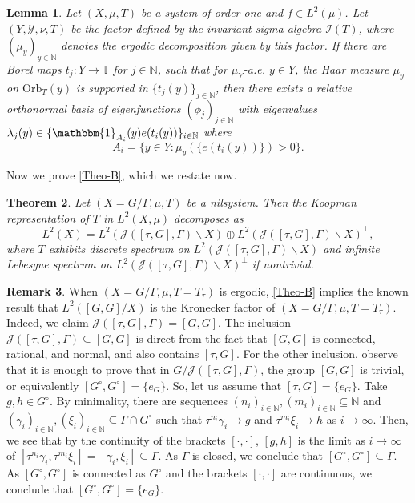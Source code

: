 \documentclass[letter, 11pt]{article}
\newtheorem{theorem}{Theorem}[section]
\newtheorem{lemma}[theorem]{Lemma}
\theoremstyle{definition}
\newtheorem{remark}[theorem]{Remark}
\theoremstyle{plain}
\newcommand{\N}{\mathbb{N}}
\newcommand{\T}{\mathbb{T}}
\newcommand{\ind}[1]{\mathbbm{1}_{#1}}
\newcommand{\1}{\mathbbm{1}}
\begin{document}
\begin{lemma}\label{relative-basis}
    Let $(X,\mu,T)$ be a system of order one and $f\in L^2(\mu)$. Let $(Y,\mathcal{Y},\nu,T)$ be the factor defined by the invariant sigma algebra $\mathcal{I}(T)$, where $(\mu_y)_{y\in \N}$ denotes the ergodic decomposition given by this factor. If there are Borel maps $t_j:Y\to \T$ for $j\in \N$, such that for $\mu_Y$-a.e. $y\in Y$, the Haar measure $\mu_y$ on $\overline{\mathrm{Orb}}_{T}(y)$ is supported in $\{t_j(y)\}_{j\in \N}$, then there exists a relative orthonormal basis of eigenfunctions $(\phi_j)_{j\in\N}$ with eigenvalues $\lambda_j(y) \in\{\ind{A_i}(y) e(t_i(y))\}_{i\in \N}$ where 
    $$A_i=\{y\in Y : \mu_y(\{e(t_i(y))\})>0 \}. $$
\end{lemma}

Now we prove \cref{Theo-B}, which we restate now. 
\begin{theorem}\label{spectral-decomposition}
Let $(X=G/\Gamma,\mu,T)$ be a nilsystem. Then the Koopman representation of $T$ in $L^2(X,\mu)$ decomposes as
  $$ L^2(X)=L^2(\mathcal{J}([\tau,G],\Gamma)\backslash X)\oplus L^2(\mathcal{J}([\tau,G],\Gamma)\backslash X)^\perp,$$
  where $T$ exhibits discrete spectrum on $L^2(\mathcal{J}([\tau,G],\Gamma)\backslash X)$ and infinite Lebesgue spectrum on $L^2(\mathcal{J}([\tau,G],\Gamma)\backslash X)^\perp$ if nontrivial.
\end{theorem}
\begin{remark}\label{theo-B-erg}
When $(X=G/\Gamma,\mu,T=T_\tau)$ is ergodic, \cref{Theo-B} implies the known result that $L^2([G,G]/X)$ is the Kronecker factor of $(X=G/\Gamma,\mu,T=T_\tau)$. Indeed, we claim $\mathcal{J}([\tau,G],\Gamma)=[G,G]$. The inclusion $\mathcal{J}([\tau,G],\Gamma)
\subseteq [G,G]$ is direct from the fact that $[G,G]$ is connected, rational, and normal, and also contains $[\tau,G]$. For the other inclusion, observe that it is enough to prove that in $G/\mathcal{J}([\tau,G],\Gamma)$, the group $[G,G]$ is trivial, or equivalently $[G^{\circ},G^{\circ}]=\{e_G\}$. So, let us assume that $[\tau,G]=\{e_G\}$. Take $g,h\in G^{\circ}$. By minimality, there are sequences $(n_i)_{i\in \N},(m_i)_{i\in \N}\subseteq \N$ and $(\gamma_i)_{i\in \N}, (\xi_{i})_{i\in \N}\subseteq \Gamma \cap G^{\circ}$ such that $\tau^{n_i}\gamma_i\to g$ and $\tau^{m_i}\xi_i\to h$ as $i\to \infty.$ Then, we see that by the continuity of the brackets $[\cdot,\cdot]$, $[g,h]$ is the limit as $i\to \infty$ of $[\tau^{n_i}\gamma_i,\tau^{m_i}\xi_i]= [\gamma_i,\xi_i]\subseteq \Gamma. $ As $\Gamma$ is closed, we conclude that $[G^{\circ},G^{\circ}]\subseteq \Gamma$. As $[G^{\circ},G^{\circ}]$ is connected as $G^\circ$ and the brackets $[\cdot,\cdot]$ are continuous, we conclude that $[G^{\circ},G^{\circ}]=\{e_G\}$.
\end{remark}
\end{document}

